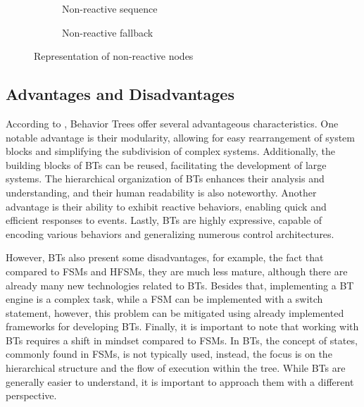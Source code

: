\begin{figure}[!h]
    \centering
    \begin{subfigure}[b]{.49\linewidth}
        \centering
        \scalebox{1.0} {
            \begin{forest}
            \end{forest}
        }
        \caption{Non-reactive sequence}
    \end{subfigure}
    \hfill
    \begin{subfigure}[b]{.49\linewidth}
        \centering
        \scalebox{1.0} {
            \begin{forest}
            \end{forest}
        }
        \caption{Non-reactive fallback}
    \end{subfigure}
    \caption{Representation of non-reactive nodes}
    \label{fig:background_non_reactive_nodes}
\end{figure}

\subsection{Advantages and Disadvantages}

According to \cite{BTsInRobotics}, Behavior Trees offer several advantageous characteristics. One notable advantage is their modularity, allowing for easy rearrangement of system blocks and simplifying the subdivision of complex systems. Additionally, the building blocks of BTs can be reused, facilitating the development of large systems. The hierarchical organization of BTs enhances their analysis and understanding, and their human readability is also noteworthy. Another advantage is their ability to exhibit reactive behaviors, enabling quick and efficient responses to events. Lastly, BTs are highly expressive, capable of encoding various behaviors and generalizing numerous control architectures.

However, BTs also present some disadvantages, for example, the fact that compared to FSMs and HFSMs, they are much less mature, although there are already many new technologies related to BTs. Besides that, implementing a BT engine is a complex task, while a FSM can be implemented with a switch statement, however, this problem can be mitigated using already implemented frameworks for developing BTs. Finally, it is important to note that working with BTs requires a shift in mindset compared to FSMs. In BTs, the concept of states, commonly found in FSMs, is not typically used, instead, the focus is on the hierarchical structure and the flow of execution within the tree. While BTs are generally easier to understand, it is important to approach them with a different perspective.

